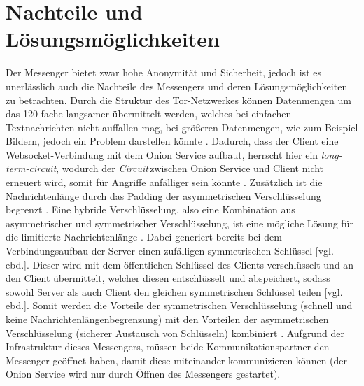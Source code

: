 \documentclass[a4paper,ngerman, headheight=28pt,12pt]{scrartcl}
\newcommand{\vcite}[1]{\cite[vgl.][]{#1}}
\newcommand{\vebd}{[vgl. ebd.]}
\newcommand{\circuit}{\textit{Circuit\,}}
\begin{document}
\section{Nachteile und Lösungsmöglichkeiten}
Der Messenger bietet zwar hohe Anonymität und Sicherheit, jedoch ist es unerlässlich auch die Nachteile des Messengers und deren Lösungsmöglichkeiten zu betrachten. Durch die Struktur des Tor-Netzwerkes können Datenmengen um das 120-fache langsamer übermittelt werden, welches bei einfachen Textnachrichten nicht auffallen mag, bei größeren Datenmengen, wie zum Beispiel Bildern, jedoch ein Problem darstellen könnte \vcite{TorPerformance}. Dadurch, dass der Client eine Websocket-Verbindung mit dem Onion Service aufbaut, herrscht hier ein \textit{long-term-circuit}, wodurch der \circuit zwischen Onion Service und Client nicht erneuert wird, somit für Angriffe anfälliger sein könnte \vcite{FAQCircuitLifetime}. Zusätzlich ist die Nachrichtenlänge durch das Padding der asymmetrischen Verschlüsselung begrenzt \vcite{OpensslRsaMaxLength}.
Eine hybride Verschlüsselung, also eine Kombination aus asymmetrischer und symmetrischer Verschlüsselung, ist eine mögliche Lösung für die limitierte Nachrichtenlänge \vcite{HybridEncryption}. Dabei generiert bereits bei dem Verbindungsaufbau der Server einen zufälligen symmetrischen Schlüssel \vebd. Dieser wird mit dem öffentlichen Schlüssel des Clients verschlüsselt und an den Client übermittelt, welcher diesen entschlüsselt und abspeichert, sodass sowohl Server als auch Client den gleichen symmetrischen Schlüssel teilen \vebd.
Somit werden die Vorteile der symmetrischen Verschlüsselung (schnell und keine Nachrichtenlängenbegrenzung) mit den Vorteilen der asymmetrischen Verschlüsselung (sicherer Austausch von Schlüsseln) kombiniert \vcite{HybridTechnopedia}. Aufgrund der Infrastruktur dieses Messengers, müssen beide Kommunikationspartner den Messenger geöffnet haben, damit diese miteinander kommunizieren können (der Onion Service wird nur durch Öffnen des Messengers gestartet).
\end{document}
